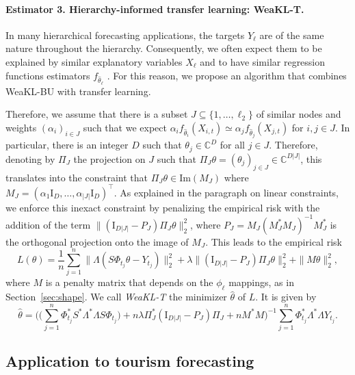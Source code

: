\paragraph{Estimator 3. Hierarchy-informed transfer learning: WeaKL-T.} In many hierarchical forecasting applications, the targets $Y_{\ell}$ are of the same nature throughout the hierarchy. Consequently, we often expect them to be explained by similar explanatory variables $X_{\ell}$ and to have similar regression functions estimators $f_{\hat{\theta}_\ell}$ \citep[e.g.,][]{leprince2023hierarchical}. For this reason, we propose an algorithm that combines WeaKL-BU with transfer learning.

Therefore, we assume that there is a subset $J \subseteq \{1,
\hdots, \ell_2\}$ of similar nodes and weights $(\alpha_i)_{i\in J}$ such that we expect $\alpha_i f_{\hat \theta_{i}}(X_{i,t}) \simeq \alpha_j f_{\hat \theta_{j}}(X_{j,t})$ for $i, j \in J$. 
In particular, there is an integer $D$ such that $\theta_j \in \mathbb{C}^{D}$ for all $j\in J$.
Therefore, denoting by $\Pi_J$ the projection on $J$ such that $\Pi_J\theta = (\theta_j)_{j\in J}\in \mathbb C^{D|J|}$, this translates into the constraint that $\Pi_J \theta \in \mathrm{Im}(M_J)$ where $M_J = (\alpha_1 \mathrm{I}_{D}, \hdots, \alpha_{|J|} \mathrm{I}_{D})^\top$.
As explained in the paragraph on linear constraints, we enforce this inexact constraint by penalizing the empirical risk with the addition of the term $\|(\mathrm{I}_{D|J|}-P_J)\Pi_J\theta\|_2^2$, where $P_J = M_J(M_J^\ast M_J)^{-1}M_J^\ast$ is the orthogonal projection onto the image of $M_J $.
This leads to the empirical risk
\[L(\theta) = \frac{1}{n}\sum_{j=1}^n\|\Lambda( S\mathbb \Phi_{t_j} \theta - Y_{t_j})\|_2^2+\lambda \|(\mathrm{I}_{D|J|}-P_{J})\Pi_{J}\theta\|_2^2 + \|M\theta\|_2^2,\]
where $M$ is a penalty matrix that depends on the $\phi_\ell$ mappings, as in Section~\ref{sec:shape}.
We call {\it WeaKL-T} the minimizer $\hat \theta$ of $L$. It is given by
    \begin{equation}
    \label{eq:pikl-T}
        \hat \theta = \Big(\Big(\sum_{j=1}^n \mathbb \Phi_{t_j}^\ast S^\ast\Lambda^\ast \Lambda S\mathbb \Phi_{t_j}\Big)+  n\lambda \Pi_{J}^\ast(\mathrm{I}_{D|J|}-P_{J})\Pi_{J}+nM^\ast M\Big)^{-1} \sum_{j=1}^n \mathbb \Phi_{t_j}^\ast\Lambda^\ast \Lambda Y_{t_j}.
    \end{equation}


\subsection{Application to tourism forecasting}
\label{sec:tourism}
